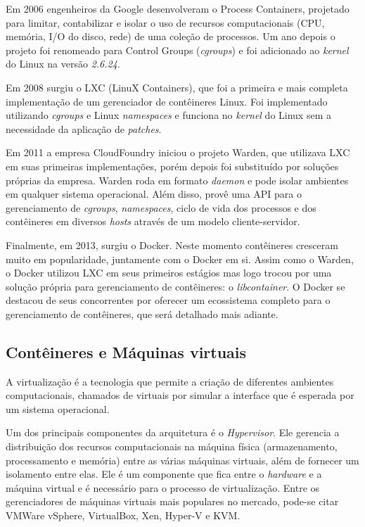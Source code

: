 	Em 2006 engenheiros da Google desenvolveram o Process Containers, projetado para limitar, contabilizar e isolar o uso de recursos computacionais (CPU, memória, I/O do disco, rede) de uma coleção de processos. Um ano depois o projeto foi renomeado para Control Groups (\textit{cgroups}) e foi adicionado ao \textit{kernel} do Linux na versão \textit{2.6.24}.

	Em 2008 surgiu o LXC (LinuX Containers), que foi a primeira e mais completa implementação de um gerenciador de contêineres Linux. Foi implementado utilizando \textit{cgroups} e Linux \textit{namespaces} e funciona no \textit{kernel} do Linux sem a necessidade da aplicação de \textit{patches}.
	
	Em 2011 a empresa CloudFoundry iniciou o projeto Warden, que utilizava LXC em suas primeiras implementações, porém depois foi substituído por soluções próprias da empresa. Warden roda em formato \textit{daemon} e pode isolar ambientes em qualquer sistema operacional. Além disso, provê uma API para o gerenciamento de \textit{cgroups}, \textit{namespaces}, ciclo de vida dos processos e dos contêineres em diversos \textit{hosts} através de um modelo cliente-servidor.

	Finalmente, em 2013, surgiu o Docker. Neste momento contêineres cresceram muito em popularidade, juntamente com o Docker em si.
	Assim como o Warden, o Docker utilizou LXC em seus primeiros estágios mas logo trocou por uma solução própria para gerenciamento de contêineres: o \textit{libcontainer}.
	O Docker se destacou de seus concorrentes por oferecer um ecossistema completo para o gerenciamento de contêineres, que será detalhado mais adiante.
	
	\subsection{Contêineres e Máquinas virtuais}
	
	A virtualização é a tecnologia que permite a criação de diferentes ambientes computacionais, chamados de virtuais por simular a interface que é esperada por um sistema operacional.
	
	Um dos principais componentes da arquitetura é o \textit{Hypervisor}. Ele gerencia a distribuição dos recursos computacionais na máquina física (armazenamento, processamento e memória) entre as várias máquinas virtuais, além de fornecer um isolamento entre elas. Ele é um componente que fica entre o \textit{hardware} e a máquina virtual e é necessário para o processo de virtualização.
	Entre os gerenciadores de máquinas virtuais mais populares no mercado, pode-se citar VMWare vSphere, VirtualBox, Xen, Hyper-V e KVM.

